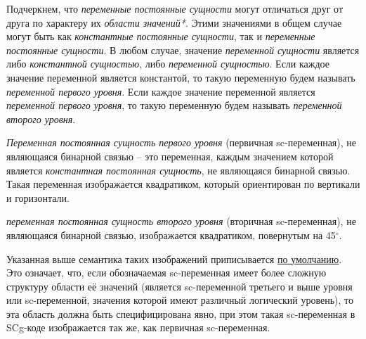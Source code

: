 \begin{SCn}
{Подчеркнем, что \textit{переменные постоянные сущности} могут отличаться друг от друга по характеру их \textit{области значений*}. Этими значениями в общем случае могут быть как \textit{константные постоянные сущности}, так и \textit{переменные постоянные сущности}. В любом случае, значение \textit{переменной сущности} является либо \textit{константной сущностью}, либо \textit{переменной сущностью}. Если каждое значение переменной является константой, то такую переменную будем называть \textit{переменной первого уровня}. Если каждое значение переменной является \textit{переменной первого уровня}, то такую переменную будем называть \textit{переменной второго уровня}. 

\textit{Переменная постоянная сущность первого уровня } (первичная sc-переменная), не являющаяся бинарной связью -- это переменная, каждым значением которой является \textit{константная постоянная сущность}, не являющаяся бинарной связью. Такая переменная изображается квадратиком, который ориентирован по вертикали и горизонтали. 

\textit{переменная постоянная сущность второго уровня} (вторичная sc-переменная), не являющаяся бинарной связью, изображается квадратиком, повернутым на 45$^\circ$. 

Указанная выше семантика таких изображений приписывается \uline{по умолчанию}. Это означает, что, если обозначаемая sc-переменная имеет более сложную структуру области её значений (является sc-переменной третьего и выше уровня или sc-переменной, значения которой имеют различный логический уровень), то эта область должна быть специфицирована явно, при этом такая sc-переменная в SCg-коде изображается так же, как первичная sc-переменная.}


\end{SCn}
